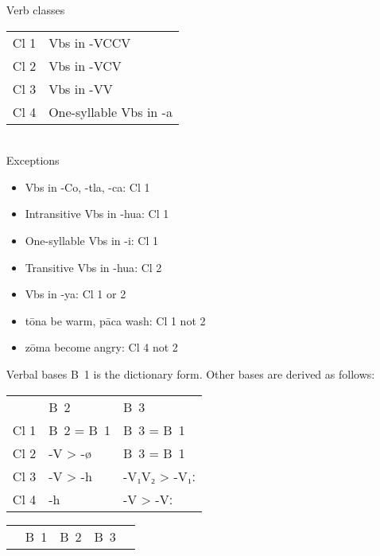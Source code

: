 \documentclass[12pt]{beamer}
\newcommand{\nah}[1]{\textcolor{nahgrn}{#1}}
\newcommand{\trs}[1]{\textcolor{nahblu}{#1}}
\begin{document}
\begin{frame}
\begin{columns}[t]
\begin{column}{0.18\linewidth}
    \end{column}
    \begin{column}{.18\linewidth}
      \begin{block}{Verb classes}
        \begin{tabular}{ll}
          Cl 1 & Vbs in \nah{-VCCV}           \\
          Cl 2 & Vbs in \nah{-VCV}            \\
          Cl 3 & Vbs in \nah{-VV}             \\
          Cl 4 & One-syllable Vbs in \nah{-a}
        \end{tabular}\\
        Exceptions
        \begin{itemize}
        \item Vbs in \nah{-Co}, \nah{-tla}, \nah{-ca}: Cl 1
        \item Intransitive Vbs in \nah{-hua}: Cl 1
        \item One-syllable Vbs in \nah{-i}: Cl 1
        \item Transitive Vbs in \nah{-hua}: Cl 2
        \item Vbs in \nah{-ya}: Cl 1 or 2
        \item \nah{tōna} \trs{be warm}, \nah{pāca} \trs{wash}: Cl 1 not 2
        \item \nah{zōma} \trs{become angry}: Cl 4 not 2
        \end{itemize}
      \end{block}
      \begin{block}{Verbal bases}
        B~1 is the dictionary form. Other bases are derived as follows:
        \begin{tabular}{lll}
          & B~2               & B~3               \\
          Cl 1 & B~2 = B~1 & B~3 = B~1 \\
          Cl 2 & \nah{-V > -ø}      & B~3 = B~1 \\
          Cl 3 & \nah{-V > -h}     & \nah{-V₁V₂ > -V₁ː}   \\
          Cl 4 & \nah{-h}     & \nah{-V > -Vː}  
        \end{tabular}
      \end{block}
      \begin{example}
        \begin{tabular}{lllll}
          & B~1          & B~2          & B~3          &                \\

\end{tabular}
\end{example}
\end{column}
\end{columns}
\end{frame}
\end{document}
